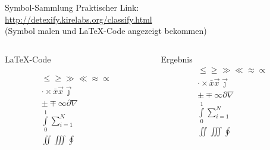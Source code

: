 \begin{frame}[fragile]{
  Symbol-Sammlung
  \hfill{}
}
  Praktischer Link: \\
  \url{http://detexify.kirelabs.org/classify.html} \\
  (Symbol malen und LaTeX-Code angezeigt bekommen)
  \begin{columns}[T]
    \begin{column}{0.7\textwidth}
      \begin{block}{\LaTeX-Code}
        \begin{lstverbatim}
        \begin{align*}
          \leq \geq \gg \ll \approx \propto \\
          \cdot \times \bar{x} \vec{x} \vec{\jmath} \\
          \pm \mp \infty \partial \nabla \\
          \int\limits_0^1 \sum\limits_{i=1}^N \\
          \iint \iiint \oint
        \end{align*}
        \end{lstverbatim}
      \end{block}
    \end{column}
    \begin{column}{0.25\textwidth}
      \begin{block}{Ergebnis}
        \begin{align*}
          \leq \geq \gg \ll \approx \propto \\
          \cdot \times \bar{x} \vec{x} \vec{\jmath} \\
          \pm \mp \infty \partial \nabla \\
          \int\limits_0^1 \sum\limits_{i=1}^N \\
          \iint \iiint \oint
        \end{align*}
      \end{block}
    \end{column}
  \end{columns}
\end{frame}

